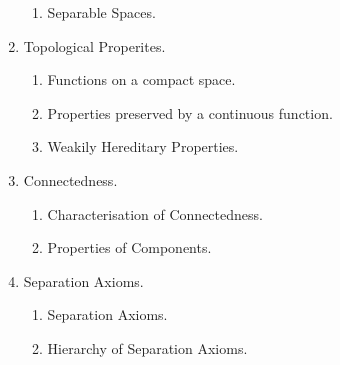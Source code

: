 \begin{enumerate}[label=Topic \arabic*]
\begin{enumerate}[label=Session \arabic*]
		\item Separable Spaces.
	\end{enumerate}
	\item Topological Properites.
	\begin{enumerate}[label=Session \arabic*]
		\item Functions on a compact space.
		\item Properties preserved by a continuous function.
		\item Weakily Hereditary Properties.
	\end{enumerate}
	\item Connectedness.
	\begin{enumerate}[label=Session \arabic*]
		\item Characterisation of Connectedness.
		\item Properties of Components.
	\end{enumerate}
	\item Separation Axioms.
	\begin{enumerate}[label=Session \arabic*]
		\item Separation Axioms.
		\item Hierarchy of Separation Axioms.
	\end{enumerate}
\end{enumerate}
